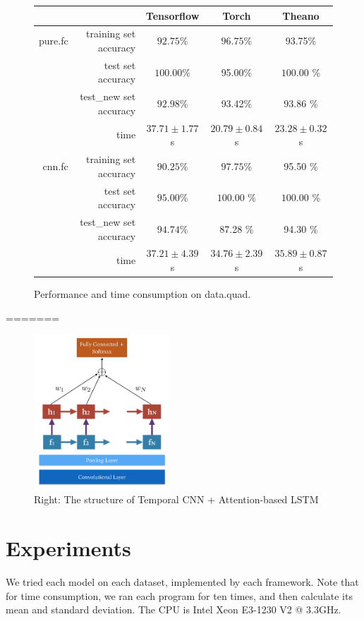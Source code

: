 \documentclass[a4paper]{article}
\begin{document}
\begin{figure}[H]
\centering
\begin{tabular}{|r|r|c|c|c|}
\hline
 & & Tensorflow & Torch & Theano \\
\hline
pure.fc & training set accuracy & $92.75\%$ & $\bm{96.75}$\% & 93.75\% \\
 & test set accuracy & $\bm{100.00}\%$ & 95.00\% & $\bm{100.00}$ \% \\
 & test\_new set accuracy & $92.98\%$ & 93.42\% & $\bm{93.86}$ \% \\
 & time & $37.71\pm1.77$s & $\bm{20.79 \pm 0.84}$ s & $23.28 \pm 0.32$s\\
\hline
cnn.fc & training set accuracy & $90.25\%$ & $\bm{97.75}$\% & 95.50 \% \\
 & test set accuracy & $95.00\%$ & $\bm{100.00}$ \% & $\bm{100.00}$ \% \\
 & test\_new set accuracy & $\bm{94.74}\%$ & 87.28 \% & 94.30 \% \\
 & time & $37.21\pm4.39$s & $\bm{34.76 \pm 2.39}$ s & $ 35.89 \pm 0.87$ s\\
\hline
\end{tabular}
\caption{Performance and time consumption on data.quad.}
\end{figure}
=======
\begin{figure}[H]
	\centering
	\includegraphics[width = 0.45\textwidth]{figs/fig_cnnattenrnn}
	\caption{Right: The structure of Temporal CNN + Attention-based LSTM}
\end{figure}

\section{Experiments}

We tried each model on each dataset, implemented by each framework.
Note that for time consumption, we ran each program for ten times, and then calculate its mean and standard deviation.
The CPU is Intel Xeon E3-1230 V2 @ 3.3GHz.
\end{document}
